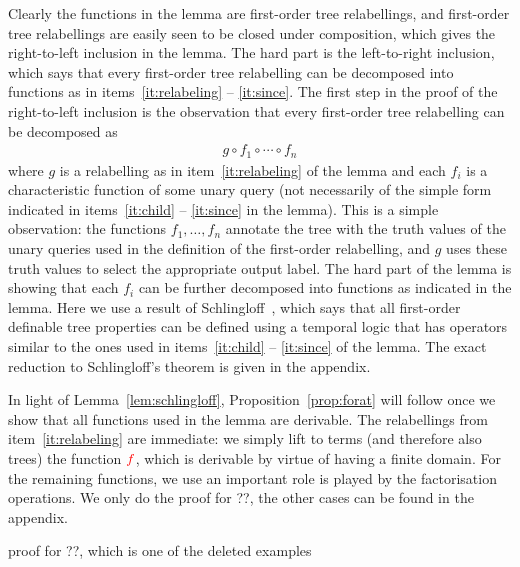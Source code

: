 Clearly the functions in the lemma are first-order tree relabellings, and first-order tree relabellings are easily seen to be closed under composition, which gives the right-to-left inclusion in the lemma. The hard part is the left-to-right inclusion, which says that every first-order tree relabelling can be decomposed into functions as in items~\ref{it:relabeling} -- \ref{it:since}. 
The first  step in the proof of  the right-to-left inclusion is the observation that  every first-order tree relabelling can be decomposed as 
\begin{align*}
    g \circ f_1 \circ \cdots \circ f_n
\end{align*}
where $g$ is a relabelling as in item~\ref{it:relabeling} of the lemma and each $f_i$ is a  characteristic function of some unary query (not necessarily of the simple form indicated in items~\ref{it:child} -- \ref{it:since} in the lemma). This is a simple observation: the functions $f_1,\ldots,f_n$ annotate the tree with the truth values of the unary queries used in the definition of the  first-order relabelling, and $g$ uses these truth values to select the appropriate output label. The hard part of the lemma is showing that each $f_i$  can be further decomposed into functions as indicated in the lemma. Here we use a result of Schlingloff~\cite[Theorem 2.6]{schlingloff1992expressive}, which says that all first-order definable tree properties can be defined using a temporal logic that has operators similar to the ones used in items~\ref{it:child} -- \ref{it:since} of the lemma. The exact reduction to Schlingloff's theorem is given in the appendix.

In light of Lemma~\ref{lem:schlingloff},  Proposition~\ref{prop:forat} will follow once we  show that all functions  used in the lemma are derivable. The relabellings from item~\ref{it:relabeling} are immediate: we simply lift to terms (and therefore also trees) the function ${\color{red}{f}}$, which is derivable by virtue of having a finite domain. For the remaining functions, we use an important role is played by the factorisation operations. We only do the proof for ??, the other cases can be found in the appendix. 

\begin{center}
    proof for ??, which is one of the deleted examples
\end{center}